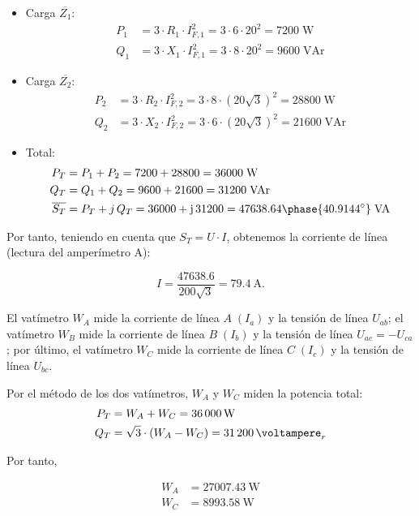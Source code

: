 \begin{itemize}
    \item Carga $\overline{Z_1}$:
    \begin{align*}
        P_1&=3\cdot R_1\cdot I_{F,1}^2=3\cdot 6\cdot 20^2=7200\;\text{W}\\
        Q_1&=3\cdot X_1\cdot I_{F,1}^2=3\cdot 8\cdot 20^2=9600\;\text{VAr}
    \end{align*}
    \item Carga $\overline{Z_2}$:
    \begin{align*}
        P_2&=3\cdot R_2\cdot I_{F,2}^2=3\cdot 8\cdot (20\sqrt{3})^2=28800\;\text{W}\\
        Q_2&=3\cdot X_2\cdot I_{F,2}^2=3\cdot 6\cdot (20\sqrt{3})^2=21600\;\text{VAr}
    \end{align*}
    \item Total:
    \begin{align*}
        P_T&=P_1+P_2=7200+28800=36000\;\text{W}\\
        Q_T&=Q_1+Q_2=9600+21600=31200\;\text{VAr}\\
        \overline{S_T}&=P_T+j\,Q_T={36000+\mathrm{j}\,31200 = 47638.64\phase{40.9144^\circ} \;\text{VA}}
    \end{align*}
\end{itemize}

Por tanto, teniendo en cuenta que $S_T = U \cdot I$, obtenemos la corriente de línea (lectura del amperímetro A):

\begin{equation*}
  I = \frac{47638.6}{200\sqrt{3}} = \qty{79.4}{\ampere}.
\end{equation*}


El vatímetro $W_A$ mide la corriente de línea $A\;(I_a)$ y la tensión de línea $U_{ab}$; el vatímetro $W_B$ mide la corriente de línea $B\;(I_b)$ y la tensión de línea $U_{ac}=-U_{ca}$; por último, el vatímetro $W_C$ mide la corriente de línea $C\;(I_c)$ y la tensión de línea $U_{bc}$.

Por el método de los dos vatímetros, $W_A$ y $W_C$ miden la potencia total: 
\begin{align*}
  P_T &= W_A + W_C =\qty{36000}{\watt}\\
  Q_T &= \sqrt{3}\cdot (W_A - W_C) = \qty{31200}{\voltampere}_r
\end{align*}

Por tanto,

\begin{align*}
  W_A &= \qty{27007.43}{\watt}\\
  W_C &= \qty{8993.58}{\watt}
\end{align*}

